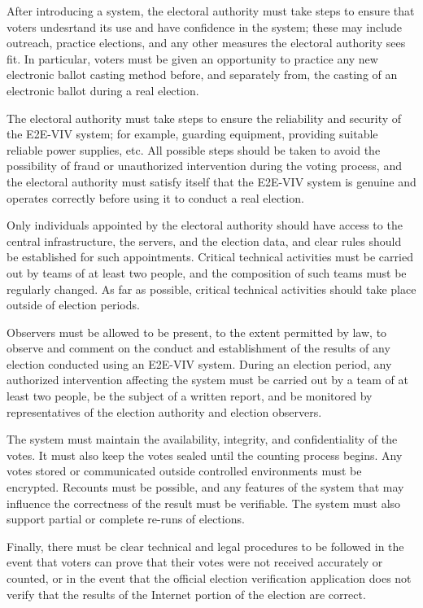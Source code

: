 After introducing a system, the electoral authority must take steps to
ensure that voters undesrtand its use and have confidence in the
system; these may include outreach, practice elections, and any other
measures the electoral authority sees fit. In particular, voters must
be given an opportunity to practice any new electronic ballot casting
method before, and separately from, the casting of an electronic
ballot during a real election.

The electoral authority must take steps to ensure the reliability and
security of the E2E-VIV system; for example, guarding equipment,
providing suitable reliable power supplies, etc. All possible steps
should be taken to avoid the possibility of fraud or unauthorized
intervention during the voting process, and the electoral authority
must satisfy itself that the E2E-VIV system is genuine and operates
correctly before using it to conduct a real election. 

Only individuals appointed by the electoral authority should have
access to the central infrastructure, the servers, and the election
data, and clear rules should be established for such
appointments. Critical technical activities must be carried out by
teams of at least two people, and the composition of such teams must
be regularly changed. As far as possible, critical technical
activities should take place outside of election periods. 

Observers must be allowed to be present, to the extent permitted by
law, to observe and comment on the conduct and establishment of the
results of any election conducted using an E2E-VIV system. During an
election period, any authorized intervention affecting the system must
be carried out by a team of at least two people, be the subject of a
written report, and be monitored by representatives of the election
authority and election observers.

The system must maintain the availability, integrity, and
confidentiality of the votes. It must also keep the votes sealed until
the counting process begins. Any votes stored or communicated outside
controlled environments must be encrypted. Recounts must be possible,
and any features of the system that may influence the correctness of
the result must be verifiable. The system must also support partial or
complete re-runs of elections. 

Finally, there must be clear technical and legal procedures to be
followed in the event that voters can prove that their votes were not
received accurately or counted, or in the event that the official
election verification application does not verify that the results of
the Internet portion of the election are correct.

